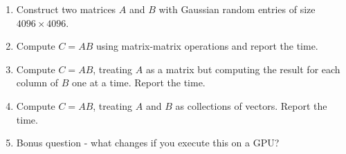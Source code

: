 \documentclass[11pt]{article}
\providecommand{\tightlist}{%
      \setlength{\itemsep}{0pt}\setlength{\parskip}{0pt}}
\begin{document}
\begin{enumerate}
\def\labelenumi{\arabic{enumi}.}
\tightlist
\item
  Construct two matrices \(A\) and \(B\) with Gaussian random entries of
  size \(4096 \times 4096\).
\item
  Compute \(C = A B\) using matrix-matrix operations and report the
  time.
\item
  Compute \(C = A B\), treating \(A\) as a matrix but computing the
  result for each column of \(B\) one at a time. Report the time.
\item
  Compute \(C = A B\), treating \(A\) and \(B\) as collections of
  vectors. Report the time.
\item
  Bonus question - what changes if you execute this on a GPU?
\end{enumerate}
\end{document}
